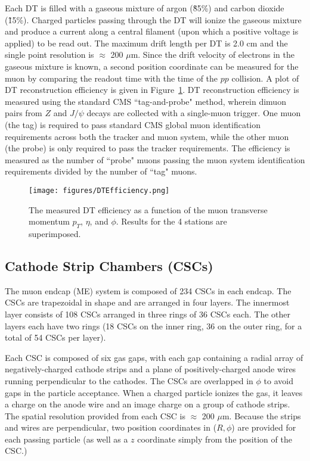 Each DT is filled with a gaseous mixture of argon (\~85\%) and carbon dioxide (\~15\%). Charged particles passing through the DT will ionize the gaseous mixture and produce a current along a central filament (upon which a positive voltage is applied) to be read out. The maximum drift length per DT is 2.0 cm and the single point resolution is $\approx$ 200 $\mu$m. Since the drift velocity of electrons in the gaseous mixture is known, a second position coordinate can be measured for the muon by comparing the readout time with the time of the $pp$ collision. A plot of DT reconstruction efficiency is given in Figure~\ref{fig:DTEfficiency}\cite{TDR}. DT reconstruction efficiency is measured using the standard CMS ``tag-and-probe" method, wherein dimuon pairs from $Z$ and $J/\psi$ decays are collected with a single-muon trigger. One muon (the tag) is required to pass standard CMS global muon identification requirements across both the tracker and muon system, while the other muon (the probe) is only required to pass the tracker requirements. The efficiency is measured as the number of ``probe" muons passing the muon system identification requirements divided by the number of ``tag" muons\cite{Muon}.

\begin{figure}\centering
  \texttt{[image: figures/DTEfficiency.png]}
  \caption{\label{fig:DTEfficiency} The measured DT efficiency as a function of the muon transverse momentum $p_T$,
$\eta$, and $\phi$. Results for the 4 stations are superimposed.}
\end{figure}

\subsection{Cathode Strip Chambers (CSCs)}

The muon endcap (ME) system is composed of 234 CSCs in each endcap. The CSCs are trapezoidal in shape and are arranged in four layers. The innermost layer consists of 108 CSCs arranged in three rings of 36 CSCs each. The other layers each have two rings (18 CSCs on the inner ring, 36 on the outer ring, for a total of 54 CSCs per layer)\cite{Muon}.

Each CSC is composed of six gas gaps, with each gap containing a radial array of negatively-charged cathode strips and a plane of positively-charged anode wires running perpendicular to the cathodes. The CSCs are overlapped in $\phi$ to avoid gaps in the particle acceptance. When a charged particle ionizes the gas, it leaves a charge on the anode wire and an image charge on a group of cathode strips. The spatial resolution provided from each CSC is $\approx$ 200 $\mu$m. Because the strips and wires are perpendicular, two position coordinates in ($R, \phi$) are provided for each passing particle (as well as a $z$ coordinate simply from the position of the CSC.)


